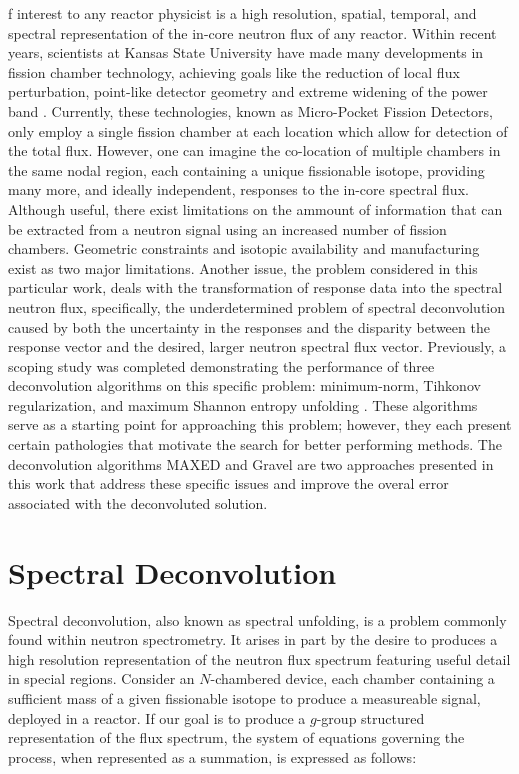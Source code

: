 \documentclass[journal]{IEEEtran}
\begin{document}
f interest to any reactor physicist is a high resolution, spatial, temporal, and spectral representation of the in-core neutron flux of any reactor.
Within recent years, scientists at Kansas State University have made many developments in fission chamber technology, achieving goals like the reduction of local flux perturbation, point-like detector geometry and extreme widening of the power band \cite{reichenberger2016micro} \cite{reichenberger2018fabrication}.
Currently, these technologies, known as Micro-Pocket Fission Detectors, only employ a single fission chamber at each location which allow for detection of the total flux.
However, one can imagine the co-location of multiple chambers in the same nodal region, each containing a unique fissionable isotope, providing many more, and ideally independent, responses to the in-core spectral flux.
Although useful, there exist limitations on the ammount of information that can be extracted from a neutron signal using an increased number of fission chambers.
Geometric constraints and isotopic availability and manufacturing exist as two major limitations.
Another issue, the problem considered in this particular work, deals with the transformation of response data into the spectral neutron flux, specifically, the underdetermined problem of spectral deconvolution caused by both the uncertainty in the responses and the disparity between the response vector and the desired, larger neutron spectral flux vector.
Previously, a scoping study was completed demonstrating the performance of three deconvolution algorithms on this specific problem: minimum-norm, Tihkonov regularization, and maximum Shannon entropy unfolding \cite{roberts2018use}.
These algorithms serve as a starting point for approaching this problem; however, they each present certain pathologies that motivate the search for better performing methods.
The deconvolution algorithms MAXED and Gravel are two approaches presented in this work that address these specific issues and improve the overal error associated with the deconvoluted solution.


\section{Spectral Deconvolution}

Spectral deconvolution, also known as spectral unfolding, is a problem commonly found within neutron spectrometry.
It arises in part by the desire to produces a high resolution representation of the neutron flux spectrum featuring useful detail in special regions.
Consider an $N$-chambered device, each chamber containing a sufficient mass of a given fissionable isotope to produce a measureable signal, deployed in a reactor.
If our goal is to produce a $g$-group structured representation of the flux spectrum, the system of equations governing the process, when represented as a summation, is expressed as follows:
\end{document}
